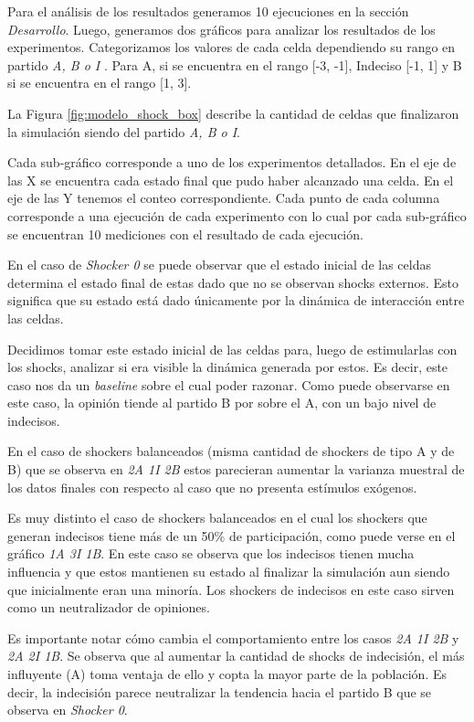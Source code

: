 Para el análisis de los resultados generamos 10 ejecuciones 
en la sección \textit{Desarrollo}.
Luego, generamos dos gráficos para analizar los resultados de los experimentos.
Categorizamos los valores de cada celda dependiendo su rango en partido
\textit{A, B o I }. Para A, si se encuentra en el rango [-3, -1], Indeciso [-1, 1]  y B si se encuentra en el rango [1, 3].

La Figura \ref{fig:modelo_shock_box} describe la cantidad de celdas que
finalizaron la simulación siendo del partido \textit{A, B o I}.

Cada sub-gráfico corresponde a uno de los experimentos detallados. En el eje de
las X se encuentra cada estado final que pudo haber alcanzado una celda. En el
eje de las Y tenemos el conteo correspondiente.  Cada punto de cada columna
corresponde a una ejecución de cada experimento con lo cual por cada
sub-gráfico se encuentran 10 mediciones con el resultado de cada ejecución.


En el caso de \textit{Shocker 0} se puede observar que el estado inicial de las
celdas determina el estado final de estas dado que no se observan shocks
externos. Esto significa que su estado está dado únicamente por la dinámica de
interacción entre las celdas.

Decidimos tomar este estado inicial de las celdas para, luego de estimularlas
con los shocks, analizar si era visible la dinámica generada por estos.
Es decir, este caso nos da un \textit{baseline} sobre el cual poder razonar. Como puede observarse en este caso, la opinión tiende al partido B por sobre el A, con un bajo nivel de indecisos.

En el caso de shockers balanceados (misma cantidad de shockers de tipo A  y de
B) que se observa en \textit{2A 1I 2B} estos
parecieran aumentar la varianza muestral de los datos finales con respecto al
caso que no presenta estímulos exógenos.

Es muy distinto el caso de shockers balanceados en el cual los shockers que generan indecisos tiene más de un 50\% de participación, como puede verse en el gráfico \textit{1A 3I 1B}.
En este caso se observa que los indecisos tienen mucha influencia y que estos
mantienen su estado al finalizar la simulación aun siendo que inicialmente eran una minoría.
Los shockers de indecisos en este caso sirven como un neutralizador de opiniones.

Es importante notar cómo cambia el comportamiento entre los casos \textit{2A 1I 2B} y \textit{2A 2I 1B}. Se observa que al aumentar la cantidad de shocks de indecisión, el más influyente (A) toma ventaja de ello y copta la mayor parte de la población. Es decir, la indecisión parece neutralizar la tendencia hacia el partido B que se observa en \textit{Shocker 0}. 

